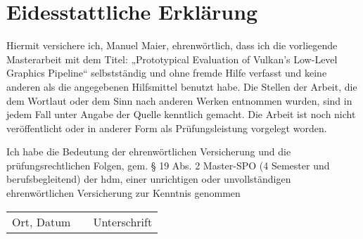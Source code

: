 
\chapter*{Eidesstattliche Erklärung}

Hiermit versichere ich, Manuel Maier, ehrenwörtlich, dass ich die vorliegende Masterarbeit mit dem Titel: „Prototypical Evaluation of Vulkan's Low-Level Graphics Pipeline“ selbstständig und ohne fremde Hilfe verfasst und keine anderen als die angegebenen Hilfsmittel benutzt habe.
Die Stellen der Arbeit, die dem Wortlaut oder dem Sinn nach anderen Werken entnommen wurden, sind in jedem Fall unter Angabe der Quelle kenntlich gemacht.
Die Arbeit ist noch nicht veröffentlicht oder in anderer Form als Prüfungsleistung vorgelegt worden.

Ich habe die Bedeutung der ehrenwörtlichen Versicherung und die prüfungsrechtlichen Folgen, gem. § 19 Abs. 2 Master-SPO (4 Semester und berufsbegleitend) der \acrshort{hdm}, einer unrichtigen oder unvollständigen ehrenwörtlichen Versicherung zur Kenntnis genommen

\vspace{\fill}

\begin{tabu} to \linewidth { X[3] X X[3] }
  \hhline{-~-}
  {\footnotesize Ort, Datum} & & {\footnotesize Unterschrift}
\end{tabu}
